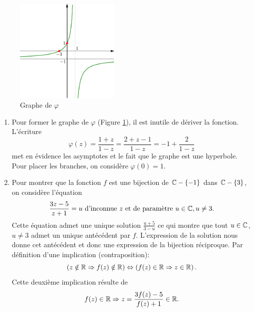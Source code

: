\begin{figure}[ht]
\centering
\includegraphics[width=5cm]{Chomog_1.pdf}
\caption{Graphe de $\varphi$}
\label{fig: Chomog_1}
\end{figure}

\begin{enumerate}
 \item Pour former le graphe de $\varphi$ (Figure \ref{fig: Chomog_1}), il est inutile de dériver la fonction. L'écriture
\begin{displaymath}
 \varphi(z) = \frac{1+z}{1-z} = \frac{2+z-1}{1-z} = -1 + \frac{2}{1-z}
\end{displaymath}
met en évidence les asymptotes et le fait que le graphe est une hyperbole. Pour placer les branches, on considère $\varphi(0)=1$.

\item Pour montrer que la fonction $f$ est une bijection de $\mathbb{C}-\{-1\}$ dans $\mathbb{C}-\{3\}$, on considère l'équation 
\[
 \frac{3z-5}{z+1} = u \text{ d'inconnue $z$ et de paramètre } u\in \mathbb{C}, u \neq 3.
\]
Cette équation admet une unique solution $\frac{u+5}{3-u}$ ce qui montre que tout $u\in\mathbb{C}$, $u\neq 3$ admet un unique antécédent par $f$. L'expression de la solution nous donne cet antécédent et donc une expression de la bijection réciproque.\newline
Par définition d'une implication (contraposition):
\[
 \left( z\notin \mathbb{R} \Rightarrow f(z)\notin \mathbb{R} \right) \Leftrightarrow \left( f(z) \in \mathbb{R} \Rightarrow z \in \mathbb{R}\right). 
\]
Cette deuxième implication résulte de 
\[
 f(z) \in \mathbb{R} \Rightarrow z = \frac{3f(z) - 5}{f(z) + 1} \in  \mathbb{R}.
\]



\end{enumerate}

